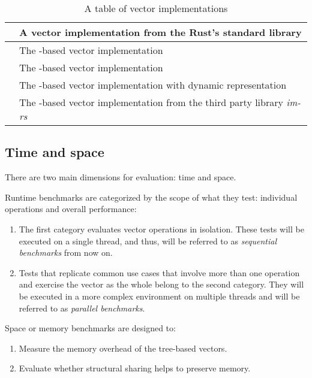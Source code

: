 \begin{table}[!htbp]
    \centering

    \begin{tabular} { |l| p{11cm} | }
        \hline
        \stdvec{} & A vector implementation from the Rust's standard library \\ \hline
        \rbvec{} & The \rbtree{}-based vector implementation \\ \hline
        \rrbvec{} & The \rrbtree{}-based vector implementation \\ \hline
        \pvec{} & The \rrbtree{}-based vector implementation with dynamic representation \\ \hline
        \imrsvec{} & The \rrbtree{}-based vector implementation from the third party library \emph{im-rs}\footnotemark{} \\ \hline
    \end{tabular}

    \label{tab:vec-implementations}
    \caption{A table of vector implementations}
\end{table}


\subsection{Time and space}
There are two main dimensions for evaluation: time and space.

Runtime benchmarks are categorized by the scope of what they test: individual operations and overall performance:
\begin{enumerate}
    \item The first category evaluates vector operations in isolation. These tests will be executed on a single thread, and thus, will be referred to as \emph{sequential benchmarks} from now on.
    \item Tests that replicate common use cases that involve more than one operation and exercise the vector as the whole belong to the second category. They will be executed in a more complex environment on multiple threads and will be referred to as \emph{parallel benchmarks}.
\end{enumerate}

Space or memory benchmarks are designed to:
\begin{enumerate}
    \item Measure the memory overhead of the tree-based vectors.
    \item Evaluate whether structural sharing helps to preserve memory.
\end{enumerate}

